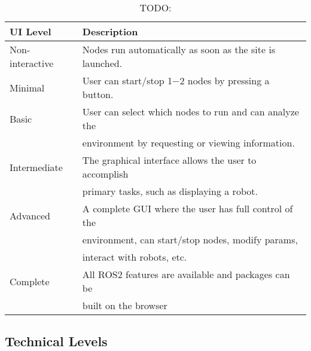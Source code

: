         \begin{table}[htbp]
            \centering	
            \caption{TODO:}
                \begin{tabular}{ll}
                    \toprule
                    \textbf{UI Level} & \textbf{Description} \\
                    \midrule
                    Non-interactive & Nodes run automatically as soon as the site is launched. \\ [0.5em]

                    Minimal         & User can start/stop 1$-$2 nodes by pressing a button. \\[0.5em]

                    Basic           & User can select which nodes to run and can analyze the \\
                                    & environment by requesting or viewing information. \\[0.5em]

                    Intermediate    & The graphical interface allows the user to accomplish \\
                                    & primary tasks, such as displaying a robot. \\[0.5em]

                    Advanced        & A complete GUI where the user has full control of the \\
                                    & environment, can start/stop nodes, modify params, \\
                                    & interact with robots, etc. \\[0.5em]
                                    
                    Complete        & All ROS2 features are available and packages can be \\
                                    & built on the browser \\
                \bottomrule
            \end{tabular}\label{tab:uilevels}
        \end{table}

    \subsection{Technical Levels}

